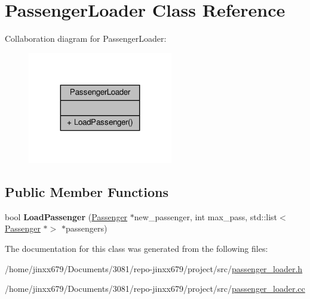 \hypertarget{classPassengerLoader}{}\section{Passenger\+Loader Class Reference}
\label{classPassengerLoader}


Collaboration diagram for Passenger\+Loader\+:\nopagebreak
\begin{figure}[H]
\begin{center}
\leavevmode
\includegraphics[width=179pt]{classPassengerLoader__coll__graph}
\end{center}
\end{figure}
\subsection*{Public Member Functions}
\begin{DoxyCompactItemize}
\item 
\mbox{\label{classPassengerLoader_a00478bfb6b51a4a2ddef13972775f97a}} 
bool {\bfseries Load\+Passenger} (\hyperlink{classPassenger}{Passenger} $\ast$new\+\_\+passenger, int max\+\_\+pass, std\+::list$<$ \hyperlink{classPassenger}{Passenger} $\ast$$>$ $\ast$passengers)
\end{DoxyCompactItemize}


The documentation for this class was generated from the following files\+:\begin{DoxyCompactItemize}
\item 
/home/jinxx679/\+Documents/3081/repo-\/jinxx679/project/src/\hyperlink{passenger__loader_8h}{passenger\+\_\+loader.\+h}\item 
/home/jinxx679/\+Documents/3081/repo-\/jinxx679/project/src/\hyperlink{passenger__loader_8cc}{passenger\+\_\+loader.\+cc}\end{DoxyCompactItemize}
